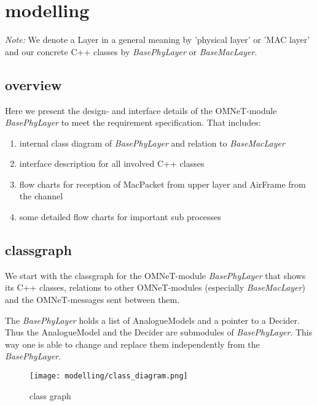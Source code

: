 \newcommand{\h}[1]{\textit{#1}}
\newcommand{\bp}{BasePhyLayer}
\newcommand{\bm}{BaseMacLayer}


\section{modelling}

\emph{Note: }We denote a Layer in a general meaning by 'physical layer' 
or 'MAC layer' and our concrete C++ classes by \h{\bp} or \h{\bm}.


\subsection{overview}

Here we present the design- and interface details of the OMNeT-module 
\h{\bp} to meet the requirement specification. That includes:

\begin{enumerate}
 \item internal class diagram of \h{\bp} and relation to \h{\bm}
 \item interface description for all involved C++ classes
 \item flow charts for reception of MacPacket from upper layer and 
 AirFrame from the channel
 \item some detailed flow charts for important sub processes
\end{enumerate}


\subsection{classgraph}

We start with the classgraph for the OMNeT-module \h{\bp} that shows 
its C++ classes, relations to other OMNeT-modules (especially \h{\bm})
and the OMNeT-messages sent between them.

The \h{\bp} holds a list of AnalogueModels and a pointer to a Decider. Thus the AnalogueModel and the Decider are submodules of \h{\bp}. This way one is able to change and replace them independently from the \h{\bp}.

\begin{figure}[H]
 \centering
 \texttt{[image: modelling/class\_diagram.png]}
 \caption{class graph}
 \label{fig: classgraph}
\end{figure}


